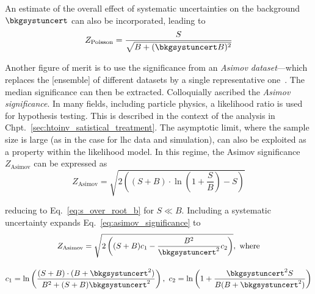 An estimate of the overall effect of systematic uncertainties on the background $\bkgsystuncert$ can also be incorporated, leading to
\begin{equation}
Z_{\mathrm{Poisson}} = \frac{S}{\sqrt{B + (\bkgsystuncert B)^2}}
\label{eq:s_over_root_b_systs}
\end{equation}

Another figure of merit is to use the significance from an \emph{Asimov dataset}---which replaces the [ensemble] of different datasets by a single representative one~\cite{Cowan:2010js}. The median significance can then be extracted. Colloquially ascribed the \emph{Asimov significance}. In many fields, including particle physics, a likelihood ratio is used for hypothesis testing. This is described in the context of the analysis in Chpt.~\ref{sec:htoinv_satistical_treatment}. The asymptotic limit, where the sample size is large (as in the case for \acrshort{lhc} data and simulation), can also be exploited as a property within the likelihood model. In this regime, the Asimov significance $Z_{\mathrm{Asimov}}$ can be expressed as  %
\begin{equation}
Z_{\mathrm{Asimov}} = \sqrt{2 \left( (S + B) \cdot \ln\left(1 + \frac{S}{B} \right) - S \right)}
\label{eq:asimov_significance}
\end{equation}

reducing to Eq.~\ref{eq:s_over_root_b} for $S \ll B$. Including a systematic uncertainty expands Eq.~\ref{eq:asimov_significance} to
\begin{equation}
    \begin{gathered}  %
Z_{\mathrm{Asimov}} = \sqrt{2 \left( (S + B) c_1 - \frac{B^2}{\bkgsystuncert^2}c_2 \right)}, \ \text{where} \\[1em]
c_1 = \ln\left( \frac{(S + B) \cdot (B + \bkgsystuncert^2)}{B^2 + (S + B)\bkgsystuncert^2} \right), \ c_2 = \ln\left( 1 + \frac{\bkgsystuncert^2 S}{B(B + \bkgsystuncert^2)} \right)
    \end{gathered}
\label{eq:asimov_significance_systs}
\end{equation}

